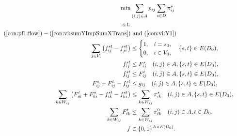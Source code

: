 \begin{subequations}[resume]
\begin{align}
\notag\min & \sum\limits_{(i,j) \in A} p_{ij} \sum\limits_{s \in D} \pi^s_{ij}\\ \notag
\text{s.t.}& && \\
\notag(\ref{con:pf1:flow})-(\ref{con:vi:sumYImpSumXTrans}) & ~\text{and} ~(\ref{con:vi:Y1}) \\
\label{con:pf2:flowHook} \sum\limits_{\substack{ j \in V_i }}\left(f^{st}_{ij}-f^{st}_{ji}\right) & \leq 
  \begin{cases}
    1, & i = s_0, \\
    0, & i\in V_0,
  \end{cases} \quad \{s,t\}\in E(D_0), \\
\label{con:pf2:startInSource}  f^{st}_{ij} & \leq F^s_{ij} \quad (i,j)\in A, \{s,t\}\in E(D_0),\\
\label{con:pf2:stopInDest}  f^{st}_{ij} & \leq F^t_{ij} \quad (i,j)\in A, \{s,t\}\in E(D_0),\\
\label{con:pf2:stronger}  F^{s}_{ij}+F^{t}_{ij}-f^{st}_{ij} &\leq g_{ij} \quad (i,j)\in A, \{s,t\}\in E(D_0),\\ 
\label{con:pf2:sumFImpSumY} \sum\limits_{k\in W_{ij}}\left(F^{t}_{ik} + F^{s}_{ki} - f^{st}_{ik} - f^{st}_{ki}\right) & \leq \sum\limits_{k\in W_{ij}}  \pi^{s}_{ik} \quad (i,j)\in A,\{s,t\}\in E(D_0),\\
\label{con:pf2:sumFImpSumY2} \sum\limits_{k\in W_{ij}}F^{t}_{ik} & \leq \sum\limits_{k\in W_{ij}}  \pi^{0}_{ik} \quad (i,j)\in A, t\in D_0,\\
\label{con:pf2:dim} f&\in\{0,1\}^{A\times E(D_0)}.
\end{align}~
\end{subequations}

